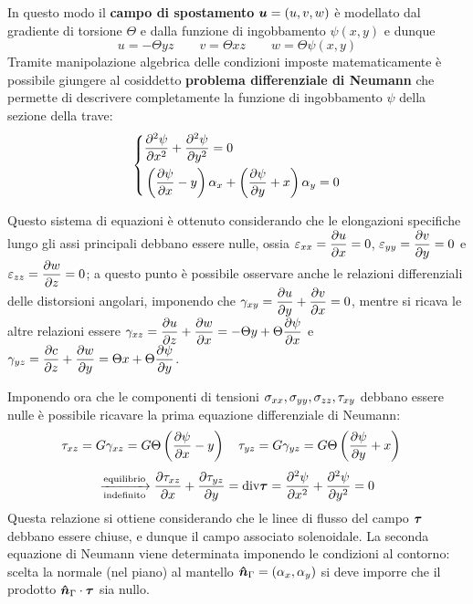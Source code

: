     	In questo modo il \textbf{campo di spostamento} $\boldsymbol{u} = (u,v,w)$ è modellato dal gradiente di torsione $\Theta$ e dalla funzione di ingobbamento $\psi(x,y)$ e dunque
    	\[ u = - \Theta yz \qquad v = \Theta xz \qquad w = \Theta \psi(x,y) \]
    	Tramite manipolazione algebrica delle condizioni imposte matematicamente è possibile giungere al cosiddetto \textbf{problema differenziale di Neumann} che permette di descrivere completamente la funzione di ingobbamento $\psi$ della sezione della trave:
    	\begin{equation}
    		\left\{ \begin{aligned}
    			& \frac{\partial^2 \psi}{\partial x^2} + \frac{\partial^2 \psi}{\partial y^2} = 0 \\
    			& \left(\frac{\partial \psi}{\partial x} - y\right) \alpha_x + \left(\frac{\partial \psi}{\partial y} + x\right) \alpha_y = 0
    		\end{aligned} \right.
    	\end{equation}
    	\begin{dimostrazione}
    		Questo sistema di equazioni è ottenuto considerando che le elongazioni specifiche lungo gli assi principali debbano essere nulle, ossia $\varepsilon_{xx} = \dfrac{\partial u}{\partial x} = 0$, $\varepsilon_{yy} = \dfrac{\partial v}{\partial y} = 0$ e $\varepsilon_{zz} = \dfrac{\partial w}{\partial z} = 0$; a questo punto è possibile osservare anche le relazioni differenziali delle distorsioni angolari, imponendo che $\gamma_{xy} = \dfrac {\partial u}{\partial y} + \dfrac{\partial v}{\partial x} = 0$, mentre si ricava le altre relazioni essere $\gamma_{xz} = \dfrac {\partial u}{\partial z} + \dfrac{\partial w}{\partial x} = -\Theta y 	+ \Theta \dfrac{\partial \psi}{\partial x}$ e $\gamma_{yz} = \dfrac {\partial c}{\partial z} + \dfrac{\partial w}{\partial y} = \Theta x 	+ \Theta \dfrac{\partial \psi}{\partial y}$.
    		
    		Imponendo ora che le componenti di tensioni $\sigma_{xx}, \sigma_{yy}, \sigma_{zz},\tau_{xy} $ debbano essere nulle è possibile ricavare la prima equazione differenziale di Neumann:
    		\[ \tau_{xz} = G\gamma_{xz} = G\Theta \left(\frac{\partial \psi}{\partial x} - y\right) \quad \tau_{yz} = G\gamma_{yz} = G\Theta \left(\frac{\partial \psi}{\partial y} +x\right) \quad \]
    		\[ \xrightarrow[\textrm{indefinito}]{\textrm{equilibrio}}  \frac{\partial \tau_{xz}}{\partial x} + \frac{\partial \tau_{yz}}{\partial y} = \textrm{div}\boldsymbol{\tau} = \frac{\partial ^2 \psi}{\partial x ^2}  + \frac{\partial ^2 \psi}{\partial y ^2} = 0  	 \]
    		Questa relazione si ottiene considerando che le linee di flusso del campo $\boldsymbol{\tau}$ debbano essere chiuse, e dunque il campo associato solenoidale. La seconda equazione di Neumann viene determinata imponendo le condizioni al contorno: scelta la normale (nel piano) al mantello $\boldsymbol{\hat{n}}_\Gamma = (\alpha_x,\alpha_y)$ 	si deve imporre che il prodotto $\boldsymbol{\hat{n}}_\Gamma \cdot \boldsymbol{\tau}$ sia nullo.   		
    	\end{dimostrazione}
    	
